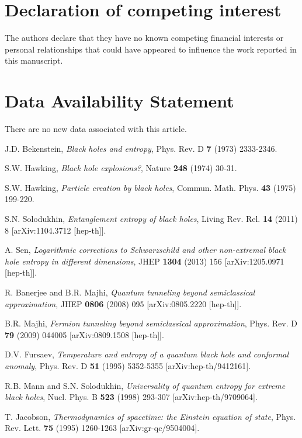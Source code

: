 \documentclass[superscriptaddress, prd, aps,amsmath,amssymb,showpacs,showkeys, onecolumn]{revtex4-2}
\begin{document}
\section*{Declaration of competing interest}
The authors declare that they have no known competing financial interests or personal relationships that could have appeared to influence the work reported in this manuscript.


\section*{Data Availability Statement}
There are no new data associated with this article.

\begin{thebibliography}{99}

J.D. Bekenstein, \emph{Black holes and entropy}, Phys. Rev. D \textbf{7} (1973) 2333-2346.

S.W. Hawking, \emph{Black hole explosions?}, Nature \textbf{248} (1974) 30-31.

S.W. Hawking, \emph{Particle creation by black holes}, Commun. Math. Phys. \textbf{43} (1975) 199-220.

S.N. Solodukhin, \emph{Entanglement entropy of black holes}, Living Rev. Rel. \textbf{14} (2011) 8 [arXiv:1104.3712 [hep-th]].

A. Sen, \emph{Logarithmic corrections to Schwarzschild and other non-extremal black hole entropy in different dimensions}, JHEP \textbf{1304} (2013) 156 [arXiv:1205.0971 [hep-th]].

R. Banerjee and B.R. Majhi, \emph{Quantum tunneling beyond semiclassical approximation}, JHEP \textbf{0806} (2008) 095 [arXiv:0805.2220 [hep-th]].

B.R. Majhi, \emph{Fermion tunneling beyond semiclassical approximation}, Phys. Rev. D \textbf{79} (2009) 044005 [arXiv:0809.1508 [hep-th]].

D.V. Fursaev, \emph{Temperature and entropy of a quantum black hole and conformal anomaly}, Phys. Rev. D \textbf{51} (1995) 5352-5355 [arXiv:hep-th/9412161].

R.B. Mann and S.N. Solodukhin, \emph{Universality of quantum entropy for extreme black holes}, Nucl. Phys. B \textbf{523} (1998) 293-307 [arXiv:hep-th/9709064].

T. Jacobson, \emph{Thermodynamics of spacetime: the Einstein equation of state}, Phys. Rev. Lett. \textbf{75} (1995) 1260-1263 [arXiv:gr-qc/9504004].


\end{thebibliography}
\end{document}
